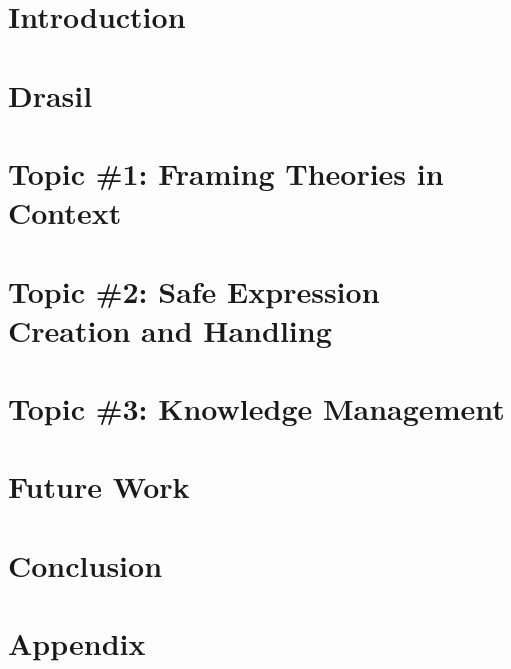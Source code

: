 \documentclass[12pt,oneside]{book}
\begin{document}
\label{lastOfFrontMatter}


\mainmatter

\chapter{Introduction}


\chapter{Drasil}


\chapter{Topic \#1: Framing Theories in Context}


\chapter{Topic \#2: Safe Expression Creation and Handling}


\chapter{Topic \#3: Knowledge Management}


\chapter{Future Work}


\chapter{Conclusion}




\backmatter

\appendix
\chapter{Appendix}


\end{document}
